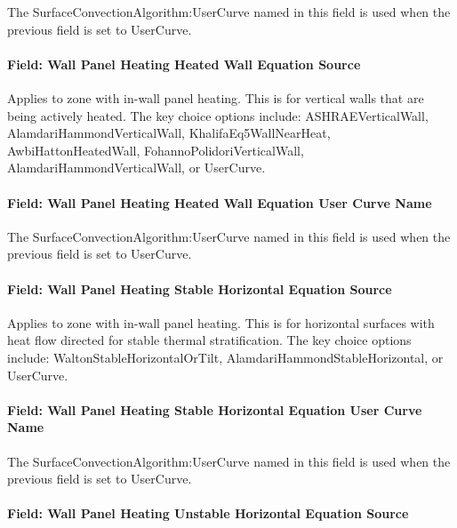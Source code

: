 The SurfaceConvectionAlgorithm:UserCurve named in this field is used when the previous field is set to UserCurve.

\paragraph{Field: Wall Panel Heating Heated Wall Equation Source}\label{field-wall-panel-heating-heated-wall-equation-source}

Applies to zone with in-wall panel heating. This is for vertical walls that are being actively heated. The key choice options include: ASHRAEVerticalWall, AlamdariHammondVerticalWall, KhalifaEq5WallNearHeat, AwbiHattonHeatedWall, FohannoPolidoriVerticalWall, AlamdariHammondVerticalWall, or UserCurve.

\paragraph{Field: Wall Panel Heating Heated Wall Equation User Curve Name}\label{field-wall-panel-heating-heated-wall-equation-user-curve-name}

The SurfaceConvectionAlgorithm:UserCurve named in this field is used when the previous field is set to UserCurve.

\paragraph{Field: Wall Panel Heating Stable Horizontal Equation Source}\label{field-wall-panel-heating-stable-horizontal-equation-source}

Applies to zone with in-wall panel heating. This is for horizontal surfaces with heat flow directed for stable thermal stratification. The key choice options include: WaltonStableHorizontalOrTilt, AlamdariHammondStableHorizontal, or UserCurve.

\paragraph{Field: Wall Panel Heating Stable Horizontal Equation User Curve Name}\label{field-wall-panel-heating-stable-horizontal-equation-user-curve-name}

The SurfaceConvectionAlgorithm:UserCurve named in this field is used when the previous field is set to UserCurve.

\paragraph{Field: Wall Panel Heating Unstable Horizontal Equation Source}\label{field-wall-panel-heating-unstable-horizontal-equation-source}


